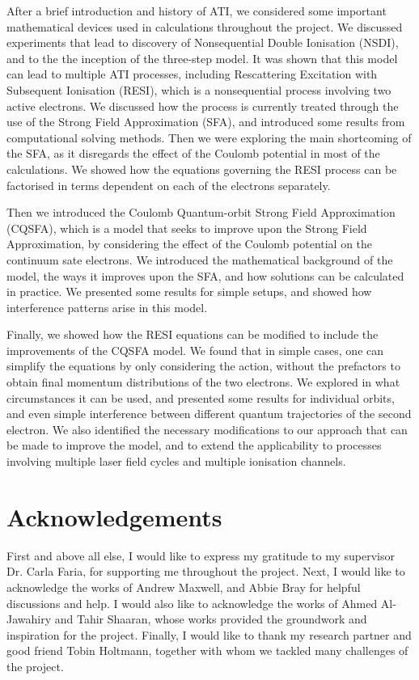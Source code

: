 \documentclass[11pt]{article}
\numberwithin{equation}{section}
\begin{document}
After a brief introduction and history of ATI, we considered some important mathematical devices used in calculations throughout the project. We discussed experiments that lead to discovery of Nonsequential Double Ionisation (NSDI), and to the the inception of the three-step model. It was shown that this model can lead to multiple ATI processes, including Rescattering Excitation with Subsequent Ionisation (RESI), which is a nonsequential process involving two active electrons. We discussed how the process is currently treated through the use of the Strong Field Approximation (SFA), and introduced some results from computational solving methods. Then we were exploring the main shortcoming of the SFA, as it disregards the effect of the Coulomb potential in most of the calculations. We showed how the equations governing the RESI process can be factorised in terms dependent on each of the electrons separately. 
\par
Then we introduced the Coulomb Quantum-orbit Strong Field Approximation (CQSFA), which is a model that seeks to improve upon the Strong Field Approximation, by considering the effect of the Coulomb potential on the continuum sate electrons. We introduced the mathematical background of the model, the ways it improves upon the SFA, and how solutions can be calculated in practice. We presented some results for simple setups, and showed how interference patterns arise in this model.
\par
Finally, we showed how the RESI equations can be modified to include the improvements of the CQSFA model. We found that in simple cases, one can simplify the equations by only considering the action, without the prefactors to obtain final momentum distributions of the two electrons. We explored in what circumstances it can be used, and presented some results for individual orbits, and even simple interference between different quantum trajectories of the second electron. We also identified the necessary modifications to our approach that can be made to improve the model, and to extend the applicability to processes involving multiple laser field cycles and multiple ionisation channels.

\section{Acknowledgements}
First and above all else, I would like to express my gratitude to my supervisor Dr. Carla Faria, for supporting me throughout the project. Next, I would like to acknowledge the works of Andrew Maxwell, and Abbie Bray for helpful discussions and help. I would also like to acknowledge the works of Ahmed Al-Jawahiry and Tahir Shaaran, whose works provided the groundwork and inspiration for the project. Finally, I would like to thank my research partner and good friend Tobin Holtmann, together with whom we tackled many challenges of the project.
\newpage
\printbibliography
\end{document}
